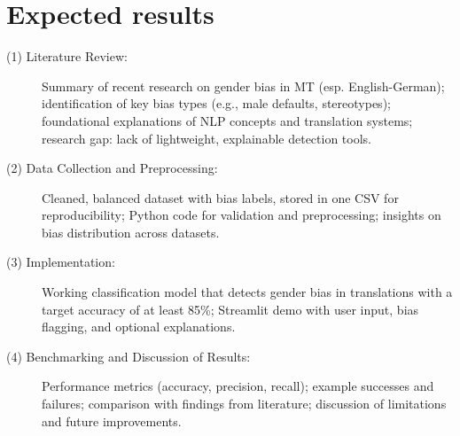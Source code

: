\section{Expected results}
\begin{description}

\item[(1) Literature Review:]
Summary of recent research on gender bias in MT (esp. English-German); identification of key bias types (e.g., male defaults, stereotypes); foundational explanations of NLP concepts and translation systems; research gap: lack of lightweight, explainable detection tools.

\item[(2) Data Collection and Preprocessing:]
Cleaned, balanced dataset with bias labels, stored in one CSV for reproducibility; Python code for validation and preprocessing; insights on bias distribution across datasets.

\item[(3) Implementation:]
Working classification model that detects gender bias in translations with a target accuracy of at least 85\%; Streamlit demo with user input, bias flagging, and optional explanations.

\item[(4) Benchmarking and Discussion of Results:]
Performance metrics (accuracy, precision, recall); example successes and failures; comparison with findings from literature; discussion of limitations and future improvements.

\end{description} 


